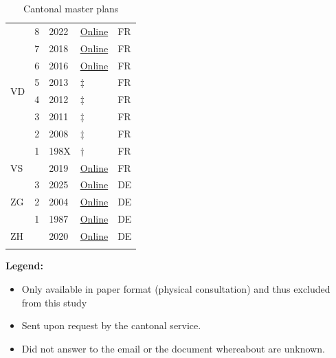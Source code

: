 {\begin{minipage}[t]{0.49\textwidth}
\begin{longtable}{|p{1cm}|p{1cm}|p{1.5cm}|p{1.5cm}|p{1cm}|}
\multirow{8}{*}{VD} & 8 & 2022 & \href{https://www.vd.ch/fileadmin/user_upload/themes/territoire/amenagement/PDCn/4quater/Version_approuvee/2022.11.11_Adaptation_PDCn_4quater.pdf}{Online} & FR \\
 & 7 & 2018 & \href{https://www.vd.ch/fileadmin/user_upload/themes/territoire/amenagement/PDCn/PDCn4_VSO_180131.pdf}{Online} & FR \\ 
 & 6 & 2016 & \href{https://www.vd.ch/fileadmin/user_upload/themes/territoire/amenagement/PDCn/Archives/PDCn3_VSO_151217.pdf}{Online} & FR \\
 & 5 & 2013 & ‡ & FR \\ 
 & 4 & 2012 & ‡ & FR \\ 
 & 3 & 2011 & ‡ & FR \\ 
 & 2 & 2008 & ‡ & FR \\ 
 & 1 & 198X & † & FR \\ \hline

\multirow{1}{*}{VS} &  & 2019 & \href{https://www.vs.ch/fr/web/sdt/plan-directeur-cantonal-2019}{Online} & FR \\ \hline

\multirow{3}{*}{ZG} & 3 & 2025 & \href{https://zg.ch/dam/jcr:f8cd851d-1bd4-4490-9ce0-75751e652747/250703_Richtplantext.pdf}{Online} & DE \\
 & 2 & 2004 & \href{https://zg.ch/dam/jcr:b0341356-58b6-4426-8968-c4ec15a56dcc/040128_Richtplantext(1).pdf}{Online} & DE \\
 & 1 & 1987 & \href{https://zg.ch/dam/jcr:250295b4-d37f-4f0b-bd29-bae2a3548568/00_1987_Richtplantext.pdf}{Online} & DE \\ \hline

\multirow{1}{*}{ZH} &  & 2020 & \href{https://www.zh.ch/de/planen-bauen/raumplanung/richtplaene.html}{Online} & DE \\ \hline

\caption{Cantonal master plans}
\label{table:listcantonalmasterplan}
\end{longtable}

\end{minipage}



\textbf{Legend:}
\begin{itemize}
    \item[†] Only available in paper format (physical consultation) and thus excluded from this study
    \item[‡] Sent upon request by the cantonal service.
    \item[*] Did not answer to the email or the document whereabout are unknown.
\end{itemize}
}